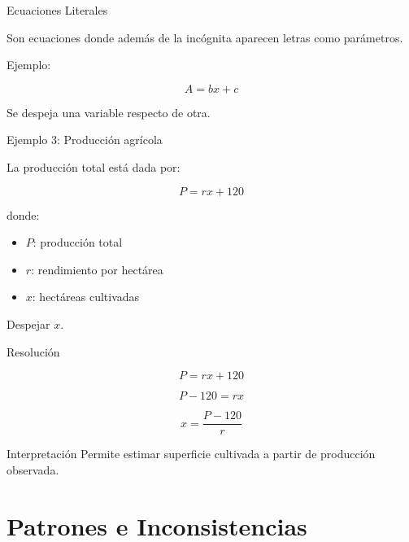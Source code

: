 \documentclass[aspectratio=169]{beamer}
\begin{document}
	\begin{frame}{Ecuaciones Literales}
		
		Son ecuaciones donde además de la incógnita aparecen letras
		como parámetros.
		
		Ejemplo:
		
		\[
		A = bx + c
		\]
		
		Se despeja una variable respecto de otra.
		
	\end{frame}
	
	\begin{frame}{Ejemplo 3: Producción agrícola}
		
		La producción total está dada por:
		
		\[
		P = rx + 120
		\]
		
		donde:
		
		\begin{itemize}
			\item \(P\): producción total
			\item \(r\): rendimiento por hectárea
			\item \(x\): hectáreas cultivadas
		\end{itemize}
		
		Despejar \(x\).
		
	\end{frame}
	
	\begin{frame}{Resolución}
		
		\[
		P = rx + 120
		\]
		
		\pause
		
		\[
		P - 120 = rx
		\]
		
		\pause
		
		\[
		x = \frac{P-120}{r}
		\]
		
		\begin{block}{Interpretación}
			Permite estimar superficie cultivada
			a partir de producción observada.
		\end{block}
		
	\end{frame}
	
	\section{Patrones e Inconsistencias}
	
\end{document}
